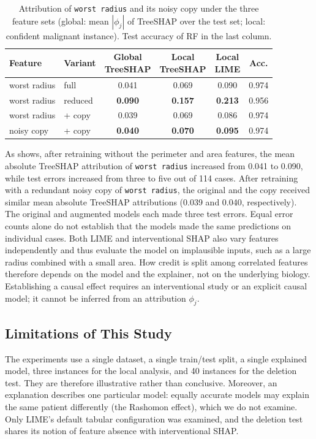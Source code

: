 \begin{table}[htbp]
    \centering
    \footnotesize
    \caption{Attribution of \texttt{worst radius} and its noisy copy under the three feature sets (global: mean $|\phi_j|$ of TreeSHAP over the test set; local: confident malignant instance). Test accuracy of RF in the last column.}
    \label{tab:correlated}
    \setlength{\tabcolsep}{3pt}
    \begin{tabular}{@{}llcccc@{}}
        \toprule
        Feature & Variant & \makecell{Global\\TreeSHAP} & \makecell{Local\\TreeSHAP} & \makecell{Local\\LIME} & Acc. \\
        \midrule
        worst radius & full & 0.041 & 0.069 & 0.090 & 0.974 \\
        worst radius & reduced & \textbf{0.090} & \textbf{0.157} & \textbf{0.213} & 0.956 \\
        worst radius & + copy & 0.039 & 0.069 & 0.086 & 0.974 \\
        noisy copy & + copy & \textbf{0.040} & \textbf{0.070} & \textbf{0.095} & 0.974 \\
        \bottomrule
    \end{tabular}
\end{table}

As  shows, after retraining without the perimeter and area features, the mean absolute TreeSHAP attribution of \texttt{worst radius} increased from 0.041 to 0.090, while test errors increased from three to five out of 114 cases. After retraining with a redundant noisy copy of \texttt{worst radius}, the original and the copy received similar mean absolute TreeSHAP attributions (0.039 and 0.040, respectively). The original and augmented models each made three test errors. Equal error counts alone do not establish that the models made the same predictions on individual cases. Both LIME and interventional SHAP also vary features independently and thus evaluate the model on implausible inputs, such as a large radius combined with a small area. How credit is split among correlated features therefore depends on the model and the explainer, not on the underlying biology.
Establishing a causal effect requires an interventional study or an explicit causal model; it cannot be inferred from an attribution $\phi_j$.

\subsection{Limitations of This Study}
The experiments use a single dataset, a single train/test split, a single explained model, three instances for the local analysis, and 40 instances for the deletion test. They are therefore illustrative rather than conclusive. Moreover, an explanation describes one particular model: equally accurate models may explain the same patient differently (the Rashomon effect), which we do not examine. Only LIME's default tabular configuration was examined, and the deletion test shares its notion of feature absence with interventional SHAP.
